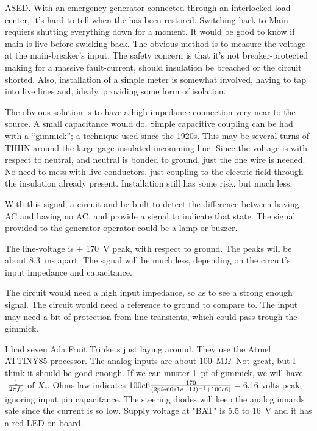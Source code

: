 


\nocon %
\datethis %




ASED.
With an emergency generator connected through an interlocked load-center, it's
hard to tell when the  has been restored.
Switching back to Main requiers shutting  everything down for a moment.
It would be good to know if main is live before swicking back. The obvious
method is to measure the voltage at the main-breaker's input.
The safety concern is that it's not breaker-protected making for a massive
fault-current,
should insulation be breached or the circuit shorted.
Also, installation of a simple meter is somewhat involved, having to tap into
live lines and, idealy, providing some form of isolation.

The obvious solution is to have a high-impedance connection very near to the
source.
A small capacitance would do.
Simple capacitive coupling can be had with a ``gimmick''; a technique used
since the 1920s.
This may be several turns of THHN around the large-gage insulated incomming
line.
Since the voltage is with respect to neutral, and neutral is bonded to ground,
just the one wire is needed.
No need to mess with live conductors, just coupling to the electric field
through the insulation already present. Installation still has some risk, but
much less.

With this signal, a circuit and be built to detect the difference between
having AC and having no AC,
and provide a signal to indicate that state.
The signal provided to the generator-operator could be a lamp or buzzer.

The line-voltage is $\pm$ 170~V peak, with respect to ground.
The peaks will be about 8.3~ms apart.
The signal will be much less, depending on the circuit's input impedance and
capacitance.

The circuit would need a high input impedance, so as to see a strong enough
signal.
The circuit would need a reference to ground to compare to.
The input may need a bit of protection from line transients, which could pass
trough the gimmick.

\fi

I had seven Ada Fruit Trinkets just laying around. They use the Atmel
ATTINY85 processor. The analog inputs are about 100~M$\Omega$. Not great, but
I think it should be good enough. If we can muster 1~pf of gimmick, we will
have $\ {1 \over 2 \pi f_c} $ of $X_c$. Ohms law indicates
$100e6 {170 \over  {(2pi*60*1e-12)^{-1} + 100e6)} } = 6.16 $ volts peak,
ignoring
input pin capacitance. The steering diodes will keep the analog innards safe
since the current is so low. Supply voltage at "BAT" is 5.5 to 16~V and it has
a red LED on-board.

